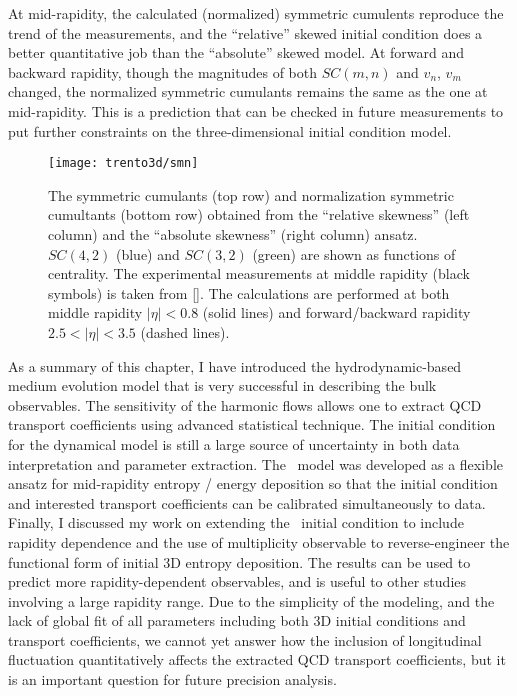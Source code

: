 At mid-rapidity, the calculated (normalized) symmetric cumulents reproduce the trend of the measurements, and the ``relative'' skewed initial condition does a better quantitative job than the ``absolute'' skewed model.
At forward and backward rapidity, though the magnitudes of both $SC(m,n)$ and $v_n$, $v_m$ changed, the normalized symmetric cumulants remains the same as the one at mid-rapidity.
This is a prediction that can be checked in future measurements to put further constraints on the three-dimensional initial condition model.

\begin{figure}
\texttt{[image: trento3d/smn]}
\caption{The symmetric cumulants (top row) and normalization symmetric cumultants (bottom row) obtained from the ``relative skewness'' (left column) and the ``absolute skewness'' (right column) ansatz.
$SC(4,2)$ (blue) and $SC(3,2)$ (green) are shown as functions of centrality. The experimental measurements at middle rapidity (black symbols) is taken from [].
The calculations are performed at both middle rapidity $|\eta|<0.8$ (solid lines) and forward/backward rapidity $2.5<|\eta|<3.5$ (dashed lines).
}
\label{fig:trento:smn} 
\end{figure}

As a summary of this chapter, I have introduced the hydrodynamic-based  medium evolution model that is very successful in describing the bulk observables.
The sensitivity of the harmonic flows allows one to extract QCD transport coefficients using advanced statistical technique.
The initial condition for the dynamical model is still a large source of uncertainty in both data interpretation and parameter extraction.
The \trento\ model was developed as a flexible ansatz for mid-rapidity entropy / energy deposition so that the initial condition and interested transport coefficients can be calibrated simultaneously to data.
Finally, I discussed my work on extending the \trento\ initial condition to include rapidity dependence and the use of multiplicity observable to reverse-engineer the functional form of initial 3D entropy deposition.
The results can be used to predict more rapidity-dependent observables, and is useful to other studies involving a large rapidity range.
Due to the simplicity of the modeling, and the lack of global fit of all parameters including both 3D initial conditions and transport coefficients, we cannot yet answer how the inclusion of longitudinal fluctuation quantitatively affects the extracted QCD transport coefficients, but it is an important question for future precision analysis.